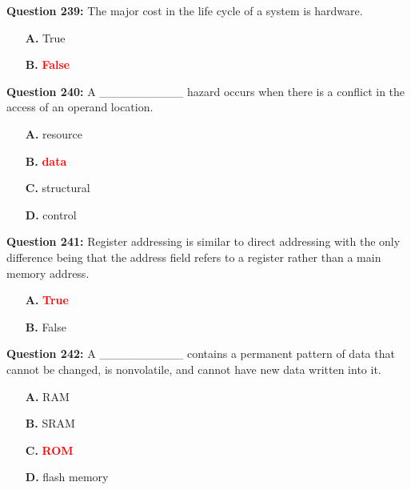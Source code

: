 \documentclass[12pt,a4paper]{article}
\begin{document}
\vspace{0.5cm}

\textbf{Question 239:} The major cost in the life cycle of a system is hardware.

\begin{itemize}
    \item[\textbf{A.}] True
    \item[\textbf{B.}] \textcolor{red}{\textbf{False}}
\end{itemize}

\vspace{0.5cm}

\textbf{Question 240:} A __________ hazard occurs when there is a conflict in the access of an operand location.

\begin{itemize}
    \item[\textbf{A.}] resource
    \item[\textbf{B.}] \textcolor{red}{\textbf{data}}
    \item[\textbf{C.}] structural
    \item[\textbf{D.}] control
\end{itemize}

\vspace{0.5cm}

\textbf{Question 241:} Register addressing is similar to direct addressing with the only difference being that the address field refers to a register rather than a main memory address.

\begin{itemize}
    \item[\textbf{A.}] \textcolor{red}{\textbf{True}}
    \item[\textbf{B.}] False
\end{itemize}

\vspace{0.5cm}

\textbf{Question 242:} A __________ contains a permanent pattern of data that cannot be changed, is nonvolatile, and cannot have new data written into it.

\begin{itemize}
    \item[\textbf{A.}] RAM
    \item[\textbf{B.}] SRAM
    \item[\textbf{C.}] \textcolor{red}{\textbf{ROM}}
    \item[\textbf{D.}] flash memory
\end{itemize}
\end{document}
